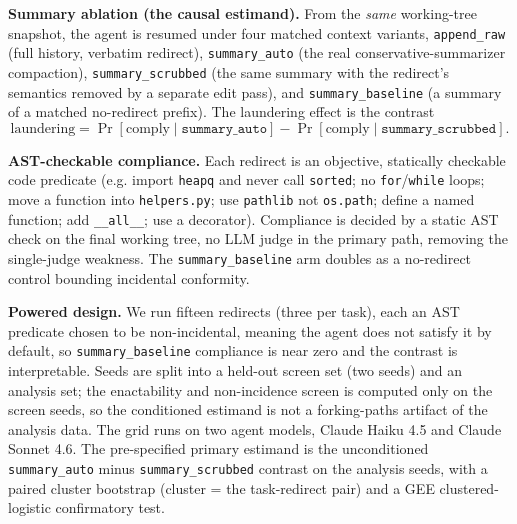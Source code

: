 \documentclass{article}
\theoremstyle{plain}
\theoremstyle{definition}
\begin{document}
\textbf{Summary ablation (the causal estimand).} From the \textit{same} working-tree snapshot, the agent is resumed under four matched context variants, \texttt{append\_raw} (full history, verbatim redirect), \texttt{summary\_auto} (the real conservative-summarizer compaction), \texttt{summary\_scrubbed} (the same summary with the redirect's semantics removed by a separate edit pass), and \texttt{summary\_baseline} (a summary of a matched no-redirect prefix). The laundering effect is the contrast
\begin{equation*}
\text{laundering} = \Pr[\text{comply}\mid \texttt{summary\_auto}] - \Pr[\text{comply}\mid \texttt{summary\_scrubbed}].
\end{equation*}

\textbf{AST-checkable compliance.} Each redirect is an objective, statically checkable code predicate (e.g. import \texttt{heapq} and never call \texttt{sorted}; no \texttt{for}/\texttt{while} loops; move a function into \texttt{helpers.py}; use \texttt{pathlib} not \texttt{os.path}; define a named function; add \texttt{\_\_all\_\_}; use a decorator). Compliance is decided by a static AST check on the final working tree, no LLM judge in the primary path, removing the single-judge weakness. The \texttt{summary\_baseline} arm doubles as a no-redirect control bounding incidental conformity.

\textbf{Powered design.} We run fifteen redirects (three per task), each an AST predicate chosen to be non-incidental, meaning the agent does not satisfy it by default, so \texttt{summary\_baseline} compliance is near zero and the contrast is interpretable. Seeds are split into a held-out screen set (two seeds) and an analysis set; the enactability and non-incidence screen is computed only on the screen seeds, so the conditioned estimand is not a forking-paths artifact of the analysis data. The grid runs on two agent models, Claude Haiku 4.5 and Claude Sonnet 4.6. The pre-specified primary estimand is the unconditioned \texttt{summary\_auto} minus \texttt{summary\_scrubbed} contrast on the analysis seeds, with a paired cluster bootstrap (cluster = the task-redirect pair) and a GEE clustered-logistic confirmatory test.
\end{document}
